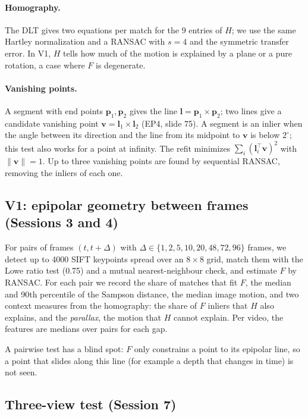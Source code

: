 \documentclass[11pt,a4paper]{article}
\begin{document}
\paragraph{Homography.}
The DLT gives two equations per match for the 9 entries of $H$; we use the same Hartley
normalization and a RANSAC with $s=4$ and the symmetric transfer error. In V1, $H$ tells
how much of the motion is explained by a plane or a pure rotation, a case where $F$ is
degenerate.

\paragraph{Vanishing points.}
A segment with end points $\mathbf{p}_1,\mathbf{p}_2$ gives the line
$\mathbf{l}=\mathbf{p}_1\times\mathbf{p}_2$; two lines give a candidate vanishing point
$\mathbf{v}=\mathbf{l}_1\times\mathbf{l}_2$ (EP4, slide 75). A segment is an inlier when the
angle between its direction and the line from its midpoint to $\mathbf{v}$ is below
$2^\circ$; this test also works for a point at infinity. The refit minimizes
$\sum_i(\mathbf{l}_i^\top\mathbf{v})^2$ with $\|\mathbf{v}\|=1$. Up to three vanishing
points are found by sequential RANSAC, removing the inliers of each one.

\subsection{V1: epipolar geometry between frames (Sessions 3 and 4)}

For pairs of frames $(t,t+\Delta)$ with $\Delta\in\{1,2,5,10,20,48,72,96\}$ frames, we detect
up to 4000 SIFT keypoints \cite{lowe2004} spread over an $8\times 8$ grid, match them with
the Lowe ratio test (0.75) and a mutual nearest-neighbour check, and estimate $F$ by RANSAC.
For each pair we record the share of matches that fit $F$, the median and 90th percentile
of the Sampson distance, the median image motion, and two context measures from the
homography: the share of $F$ inliers that $H$ also explains, and the \emph{parallax}, the
motion that $H$ cannot explain. Per video, the features are medians over pairs for each gap.

A pairwise test has a blind spot: $F$ only constrains a point to its epipolar line, so a
point that slides along this line (for example a depth that changes in time) is not seen.

\subsection{Three-view test (Session 7)}
\end{document}
